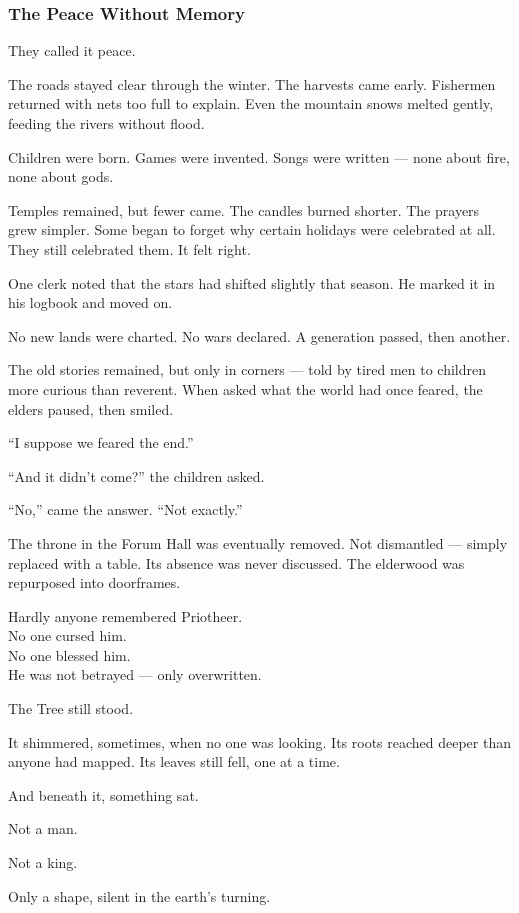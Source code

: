 \documentclass[12pt]{article}
\begin{document}
\subsubsection{The Peace Without Memory}

They called it peace.

The roads stayed clear through the winter. The harvests came early. Fishermen returned with nets too full to explain. Even the mountain snows melted gently, feeding the rivers without flood.

Children were born. Games were invented. Songs were written — none about fire, none about gods.

Temples remained, but fewer came. The candles burned shorter. The prayers grew simpler. Some began to forget why certain holidays were celebrated at all. They still celebrated them. It felt right.

One clerk noted that the stars had shifted slightly that season. He marked it in his logbook and moved on.

No new lands were charted. No wars declared. A generation passed, then another.

The old stories remained, but only in corners — told by tired men to children more curious than reverent. When asked what the world had once feared, the elders paused, then smiled.

``I suppose we feared the end.''

``And it didn’t come?'' the children asked.

``No,'' came the answer. ``Not exactly.''

The throne in the Forum Hall was eventually removed. Not dismantled — simply replaced with a table. Its absence was never discussed. The elderwood was repurposed into doorframes.

Hardly anyone remembered Priotheer.\\
No one cursed him.\\
No one blessed him.\\
He was not betrayed — only overwritten.

The Tree still stood.

It shimmered, sometimes, when no one was looking. Its roots reached deeper than anyone had mapped. Its leaves still fell, one at a time.

And beneath it, something sat.

Not a man.

Not a king.

Only a shape, silent in the earth’s turning.
\end{document}
